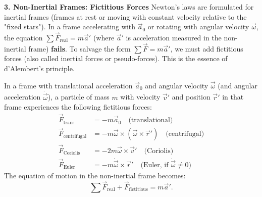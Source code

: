 \documentclass[11pt]{article}
\newcommand{\cle}[1]{{\popxbold\color{popdark}#1}}
\begin{document}
\textbf{3. Non-Inertial Frames: Fictitious Forces}
Newton's laws are formulated for \cle{inertial frames} (frames at rest or moving with constant velocity relative to the "fixed stars"). In a frame accelerating with $\vec{a}_0$ or rotating with angular velocity $\vec{\omega}$, the equation $\sum \vec{F}_{\text{real}} = m\vec{a}'$ (where $\vec{a}'$ is acceleration measured in the non-inertial frame) \textbf{fails}. To salvage the form $\sum \vec{F} = m\vec{a}'$, we must add \cle{fictitious forces} (also called inertial forces or pseudo-forces). This is the essence of d'Alembert's principle.

\begin{propriete}
In a frame with translational acceleration $\vec{a}_0$ and angular velocity $\vec{\omega}$ (and angular acceleration $\dot{\vec{\omega}}$), a particle of mass $m$ with velocity $\vec{v}'$ and position $\vec{r}'$ in that frame experiences the following fictitious forces:
\begin{align*}
\vec{F}_{\text{trans}} &= -m\vec{a}_0 \quad \text{(translational)} \\
\vec{F}_{\text{centrifugal}} &= -m\vec{\omega} \times (\vec{\omega} \times \vec{r}') \quad \text{(centrifugal)} \\
\vec{F}_{\text{Coriolis}} &= -2m\vec{\omega} \times \vec{v}' \quad \text{(Coriolis)} \\
\vec{F}_{\text{Euler}} &= -m\dot{\vec{\omega}} \times \vec{r}' \quad \text{(Euler, if $\dot{\vec{\omega}} \neq 0$)}
\end{align*}
The equation of motion in the non-inertial frame becomes:
\[
\sum \vec{F}_{\text{real}} + \vec{F}_{\text{fictitious}} = m\vec{a}'.
\]
\end{propriete}
\end{document}
